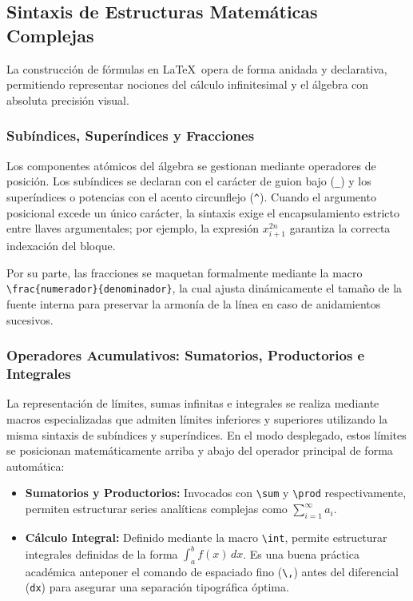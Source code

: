 \subsection{Sintaxis de Estructuras Matemáticas Complejas}
La construcción de fórmulas en \LaTeX\ opera de forma anidada y declarativa, permitiendo representar nociones del cálculo infinitesimal y el álgebra con absoluta precisión visual.

\subsubsection{Subíndices, Superíndices y Fracciones}
Los componentes atómicos del álgebra se gestionan mediante operadores de posición. Los subíndices se declaran con el carácter de guion bajo (\texttt{\_}) y los superíndices o potencias con el acento circunflejo (\texttt{\^}). Cuando el argumento posicional excede un único carácter, la sintaxis exige el encapsulamiento estricto entre llaves argumentales; por ejemplo, la expresión $x_{i+1}^{2n}$ garantiza la correcta indexación del bloque. 

Por su parte, las fracciones se maquetan formalmente mediante la macro \\ \texttt{\textbackslash frac\{numerador\}\{denominador\}}, la cual ajusta dinámicamente el tamaño de la fuente interna para preservar la armonía de la línea en caso de anidamientos sucesivos.

\subsubsection{Operadores Acumulativos: Sumatorios, Productorios e Integrales}
La representación de límites, sumas infinitas e integrales se realiza mediante macros especializadas que admiten límites inferiores y superiores utilizando la misma sintaxis de subíndices y superíndices. En el modo desplegado, estos límites se posicionan matemáticamente arriba y abajo del operador principal de forma automática:
\begin{itemize}
    \item \textbf{Sumatorios y Productorios:} Invocados con \texttt{\textbackslash sum} y \texttt{\textbackslash prod} respectivamente, permiten estructurar series analíticas complejas como $\sum_{i=1}^{\infty} a_i$.
    \item \textbf{Cálculo Integral:} Definido mediante la macro \texttt{\textbackslash int}, permite estructurar integrales definidas de la forma $\int_{a}^{b} f(x)\,dx$. Es una buena práctica académica anteponer el comando de espaciado fino (\texttt{\textbackslash,}) antes del diferencial (\texttt{dx}) para asegurar una separación tipográfica óptima.
\end{itemize}

